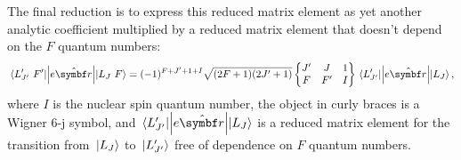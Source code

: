 The final reduction is to express this reduced matrix element as yet another analytic coefficient multiplied by a reduced matrix element that doesn't depend on the $F$ quantum numbers:
\begin{align}
\matrixel{L^\prime_{J^\prime}\ F^\prime}{\left|e\hat{\vec r}\right|}{L_J\ F} =
(-1)^{F + J^\prime + 1 + I}\sqrt{(2F+1)(2J^\prime+1)}
\left\{\begin{matrix}
J^\prime & J & 1\\
F & F^\prime & I
\end{matrix}\right\}
\matrixel{L^\prime_{J^\prime}}{\left|e\hat{\vec r}\right|}{L_J},
\end{align}
where $I$ is the nuclear spin quantum number, the object in curly braces is a Wigner $6$-j symbol, and $\matrixel{L^\prime_{J^\prime}}{\left|e\hat{\vec r}\right|}{L_J}$ is a reduced matrix element for the transition from $\ket{L_J}$ to $\ket{L^\prime_{J^\prime}}$ free of dependence on $F$ quantum  numbers.

